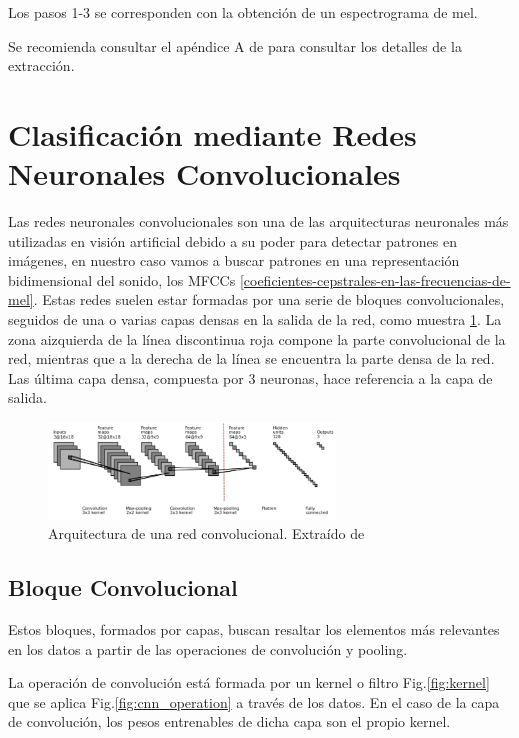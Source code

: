Los pasos 1-3 se corresponden con la obtención de un espectrograma de mel.

Se recomienda consultar el apéndice A de \cite{book_mfcc} para consultar los detalles de la extracción. 

\section{Clasificación mediante Redes Neuronales
Convolucionales}\label{clasificacion_cnn}

Las redes neuronales convolucionales son una de las arquitecturas
neuronales más utilizadas en visión artificial debido a su poder para detectar patrones en imágenes, en nuestro caso vamos a buscar patrones en una representación bidimensional del sonido, los MFCCs \ref{coeficientes-cepstrales-en-las-frecuencias-de-mel}. Estas redes suelen estar formadas por una serie de bloques
convolucionales, seguidos de una o varias capas densas en la salida de
la red, como muestra \ref{fig:bloque_conv}.
La zona aizquierda de la línea discontinua roja compone la parte convolucional de la red, mientras que a la derecha de la línea se encuentra la parte densa de la red. Las última capa densa, compuesta por 3 neuronas, hace referencia a la capa de salida. 

\begin{figure}[h]
\centering
\label{fig:bloque_conv}
\includegraphics[width=2.99679in,height=1.01667in]{img/memoria/3/cnn.png}
\caption{Arquitectura de una red convolucional. Extraído de \cite{CNN_architecture} }
\end{figure}
\hypertarget{bloque-convolucional}{%
\subsection{Bloque Convolucional}\label{bloque-convolucional}}

Estos bloques, formados por capas, buscan resaltar los elementos más
relevantes en los datos a partir de las
operaciones de convolución y pooling.

La operación de convolución está formada por un kernel o filtro Fig.\ref{fig:kernel} que se
aplica Fig.\ref{fig:cnn_operation} a través de los datos. En el caso de la capa de convolución, los
pesos entrenables de dicha capa son el propio kernel.

